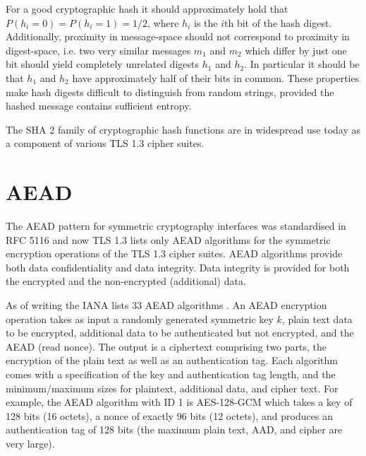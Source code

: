 

For a good cryptographic hash it should approximately hold that $P(h_i=0)=P(h_i=1)=1/2$, where $h_i$ is the $i$th bit of the hash digest.
Additionally, proximity in message-space should not correspond to proximity in digest-space, i.e. two very similar messages $m_1$ and $m_2$ which differ by just one bit should yield completely unrelated digests $h_1$ and $h_2$. In particular it should be that $h_1$ and $h_2$ have approximately half of their bits in common.
These properties make hash digests difficult to distinguish from random strings,
provided the hashed message contains
sufficient entropy.


The \ac{SHA} 2 family of cryptographic hash functions are in widespread use today as a component of various \ac{TLS} 1.3 cipher suites.
\section{AEAD}
The \ac{AEAD} pattern for symmetric cryptography interfaces was standardised in RFC 5116 \citep{rfc5116-aead} and now \ac{TLS} 1.3 lists only \ac{AEAD} algorithms for the symmetric encryption operations of the \ac{TLS} 1.3 cipher suites. \ac{AEAD} algorithms provide both data confidentiality and data integrity. Data integrity is provided for both the encrypted and the non-encrypted (additional) data.

As of writing the \ac{IANA} lists 33 \ac{AEAD} algorithms \citep{iana-aead}. An \ac{AEAD} encryption operation takes as input a randomly generated symmetric key $k$, plain text data to be encrypted, additional data to be authenticated but not encrypted, and the \ac{AEAD} \nonce (read nonce).
The output is a ciphertext comprising two parts, the encryption of the plain text as well as an authentication tag. Each algorithm comes with a specification of the key and authentication tag length, and the minimum/maximum sizes for plaintext, additional data, and cipher text. For example, the \ac{AEAD} algorithm with ID 1 is \ac{AES}-128-\ac{GCM} which takes a key of 128 bits (16 octets), a nonce of exactly 96 bits (12 octets), and produces an authentication tag of 128 bits (the maximum plain text, \ac{AAD}, and cipher are very large).

